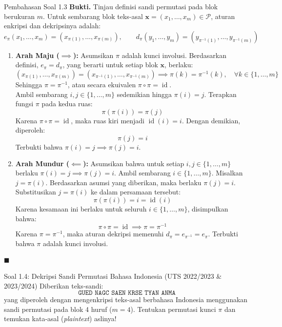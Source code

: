 \documentclass[11pt,a4paper]{article}
\newenvironment{proof}{\noindent\textbf{Bukti.}}{\hfill$\blacksquare$\vspace{0.3em}}
\begin{document}
\begin{solusibox}{Pembahasan Soal 1.3}
\begin{proof}
Tinjau definisi sandi permutasi pada blok berukuran $m$. Untuk sembarang blok teks-asal $\mathbf{x} = (x_1, \dots, x_m) \in \mathcal{P}$, aturan enkripsi dan dekripsinya adalah:
\[
e_\pi(x_1, \dots, x_m) = (x_{\pi(1)}, \dots, x_{\pi(m)}), \qquad d_\pi(y_1, \dots, y_m) = (y_{\pi^{-1}(1)}, \dots, y_{\pi^{-1}(m)})
\]
\begin{enumerate}[leftmargin=*]
    \item \textbf{Arah Maju ($\implies$):} Asumsikan $\pi$ adalah kunci involusi.
    Berdasarkan definisi, $e_\pi = d_\pi$, yang berarti untuk setiap blok $\mathbf{x}$, berlaku:
    \[
    (x_{\pi(1)}, \dots, x_{\pi(m)}) = (x_{\pi^{-1}(1)}, \dots, x_{\pi^{-1}(m)}) \implies \pi(k) = \pi^{-1}(k), \quad \forall k \in \{1, \dots, m\}
    \]
    Sehingga $\pi = \pi^{-1}$, atau secara ekuivalen $\pi \circ \pi = \operatorname{id}$.\\
    Ambil sembarang $i, j \in \{1, \dots, m\}$ sedemikian hingga $\pi(i) = j$.
    Terapkan fungsi $\pi$ pada kedua ruas:
    \[
    \pi(\pi(i)) = \pi(j)
    \]
    Karena $\pi \circ \pi = \operatorname{id}$, maka ruas kiri menjadi $\operatorname{id}(i) = i$. Dengan demikian, diperoleh:
    \[
    \pi(j) = i
    \]
    Terbukti bahwa $\pi(i) = j \implies \pi(j) = i$.
    \item \textbf{Arah Mundur ($\impliedby$):} Asumsikan bahwa untuk setiap $i, j \in \{1, \dots, m\}$ berlaku $\pi(i) = j \implies \pi(j) = i$.
    Ambil sembarang $i \in \{1, \dots, m\}$. Misalkan $j = \pi(i)$.
    Berdasarkan asumsi yang diberikan, maka berlaku $\pi(j) = i$.
    Substitusikan $j = \pi(i)$ ke dalam persamaan tersebut:
    \[
    \pi(\pi(i)) = i = \operatorname{id}(i)
    \]
    Karena kesamaan ini berlaku untuk seluruh $i \in \{1, \dots, m\}$, disimpulkan bahwa:
    \[
    \pi \circ \pi = \operatorname{id} \implies \pi = \pi^{-1}
    \]
    Karena $\pi = \pi^{-1}$, maka aturan dekripsi memenuhi $d_\pi = e_{\pi^{-1}} = e_\pi$. Terbukti bahwa $\pi$ adalah kunci involusi.
\end{enumerate}
\end{proof}
\end{solusibox}

\vspace{0.4cm}

\begin{soalbox}{Soal 1.4: Dekripsi Sandi Permutasi Bahasa Indonesia (UTS 2022/2023 \& 2023/2024)}
Diberikan teks-sandi:
\[
\texttt{GUED NAGC SAEN KRSE TYAN ANMA}
\]
yang diperoleh dengan mengenkripsi teks-asal berbahasa Indonesia menggunakan sandi permutasi pada blok 4 huruf ($m = 4$).
Tentukan permutasi kunci $\pi$ dan temukan kata-asal (\textit{plaintext}) aslinya!
\end{soalbox}
\end{document}
